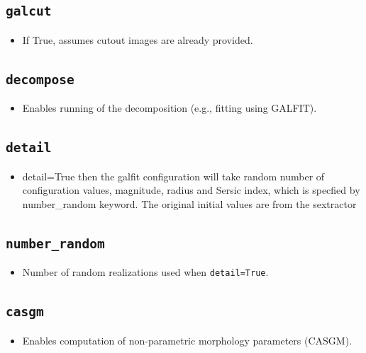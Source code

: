 \documentclass[11pt]{article}
\begin{document}
\subsection{\texttt{galcut}}
\begin{itemize}
\item If True, assumes cutout images are already provided.
\end{itemize}

\subsection{\texttt{decompose}}
\begin{itemize}
\item Enables running of the decomposition (e.g., fitting using GALFIT).
\end{itemize}

\subsection{\texttt{detail}}

\begin{itemize}
\item detail=True then the galfit configuration will take random number of
configuration values, magnitude, radius and Sersic index, which is
specfied by number\_random keyword. The original initial values are from
the sextractor 


\end{itemize}

\subsection{\texttt{number\_random}}
\begin{itemize}
\item Number of random realizations used when \texttt{detail=True}.
\end{itemize}

\subsection{\texttt{casgm}}
\begin{itemize}
\item Enables computation of non-parametric morphology parameters (CASGM).
\end{itemize}
\end{document}

